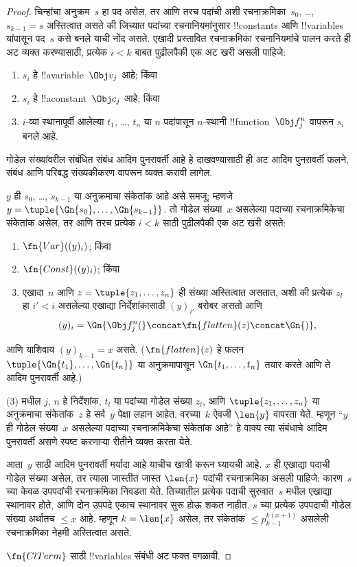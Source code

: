 \documentclass[../../../include/open-logic-section]{subfiles}
\begin{document}
\begin{proof}
चिन्हांचा अनुक्रम~$s$ हा पद असेल, तर आणि तरच पदांची अशी
रचनाक्रमिका~$s_0$, \dots, $s_{k-1} = s$ अस्तित्वात असते की जिच्यात
पदांच्या रचनानियमांनुसार !!{constant}s आणि !!{variable}s यांपासून
पद~$s$ कसे बनले याची नोंद असते. एखादी प्रस्तावित रचनाक्रमिका
रचनानियमांचे पालन करते ही अट व्यक्त करण्यासाठी, प्रत्येक $i < k$
बाबत पुढीलपैकी एक अट खरी असली पाहिजे:
\begin{enumerate}
\item $s_i$ हे !!a{variable}~$\Obj v_j$ आहे; किंवा
\item $s_i$ हे !!a{constant}~$\Obj c_j$ आहे; किंवा
\item $i$-व्या स्थानापूर्वी आलेल्या $t_1$, \dots, $t_n$ या $n$
  पदांपासून $n$-स्थानी !!{function}~$\Obj f^n_j$ वापरून $s_i$ बनले आहे.
\end{enumerate}
गोडेल संख्यांवरील संबंधित संबंध आदिम पुनरावर्ती आहे हे दाखवण्यासाठी
ही अट आदिम पुनरावर्ती फलने, संबंध आणि परिबद्ध संख्यकीकरण वापरून
व्यक्त करावी लागेल.

$y$ ही $s_0$, \dots, $s_{k-1}$ या अनुक्रमाचा संकेतांक आहे असे समजू;
म्हणजे $y = \tuple{\Gn{s_0}, \dots, \Gn{s_{k-1}}}$. तो गोडेल
संख्या~$x$ असलेल्या पदाच्या रचनाक्रमिकेचा संकेतांक असेल, तर आणि तरच
प्रत्येक $i < k$ साठी पुढीलपैकी एक अट खरी असते:
\begin{enumerate}
\item $\fn{Var}((y)_i)$; किंवा
\item $\fn{Const}((y)_i)$; किंवा
\item एखादा~$n$ आणि $z = \tuple{z_1, \dots, z_n}$ ही संख्या
  अस्तित्वात असतात, अशी की प्रत्येक $z_l$ हा $i' < i$ असलेल्या
  एखाद्या निर्देशांकासाठी $(y)_{i'}$ बरोबर असतो आणि
\[
(y)_i = \Gn{\Obj f^n_j(} \concat \fn{flatten}(z) \concat \Gn{)},
\]
\end{enumerate}
आणि याशिवाय $(y)_{k-1} = x$ असते. ($\fn{flatten}(z)$ हे फलन
$\tuple{\Gn{t_1}, \dots, \Gn{t_n}}$ या अनुक्रमापासून
$\Gn{t_1, \dots, t_n}$ तयार करते आणि ते आदिम पुनरावर्ती आहे.)

(3) मधील $j$, $n$ हे निर्देशांक, $t_l$ या पदांच्या गोडेल संख्या
$z_l$, आणि $\tuple{z_1, \dots, z_n}$ या अनुक्रमाचा संकेतांक~$z$
हे सर्व~$y$ पेक्षा लहान आहेत. वरच्या~$k$ ऐवजी $\len{y}$
वापरता येते. म्हणून ``$y$ ही गोडेल संख्या~$x$ असलेल्या पदाच्या
रचनाक्रमिकेचा संकेतांक आहे'' हे वाक्य त्या संबंधाचे आदिम पुनरावर्ती
असणे स्पष्ट करणाऱ्या रीतीने व्यक्त करता येते.

आता~$y$ साठी आदिम पुनरावर्ती मर्यादा आहे याचीच खात्री करून घ्यायची
आहे. $x$ ही एखाद्या पदाची गोडेल संख्या असेल, तर त्याला जास्तीत
जास्त $\len{x}$ पदांची रचनाक्रमिका असली पाहिजे: कारण~$s$ च्या
केवळ उपपदांची रचनाक्रमिका निवडता येते. तिच्यातील प्रत्येक पदाची
सुरुवात~$s$ मधील एखाद्या स्थानावर
होते, आणि दोन उपपदे एकाच स्थानावर सुरू होऊ शकत नाहीत. $s$ च्या
प्रत्येक उपपदाची गोडेल संख्या अर्थातच $\le x$ आहे. म्हणून
$k=\len{x}$ असेल, तर संकेतांक $\le p_{k-1}^{k(x+1)}$ असलेली
रचनाक्रमिका नेहमी अस्तित्वात असते.

$\fn{ClTerm}$ साठी !!{variable}s संबंधी अट फक्त वगळावी.
\end{proof}
\end{document}
